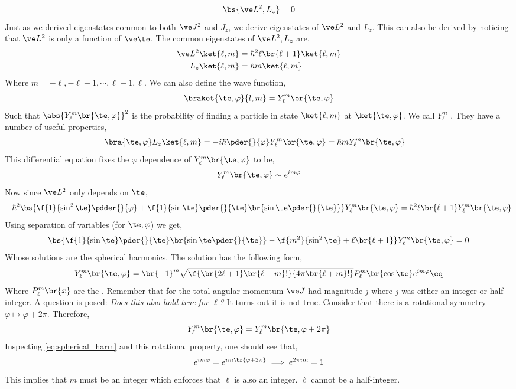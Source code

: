 \documentclass{article}
\begin{document}
\[ \bs{\ve L^2, L_z} = 0 \]
Just as we derived eigenstates common to both $\ve J^2$ and $J_z$, we derive eigenstates of $\ve L^2$ and $L_z$. This can also be derived by noticing that $\ve L^2$ is only a function of $\ve \te$. The common eigenstates of $\ve L^2, L_z$ are,
\begin{align*}
    \ve L^2 \ket{\ell, m} &= \hbar^2 \ell \br{\ell + 1} \ket{\ell, m} \\
    L_z \ket{\ell, m} &= \hbar m \ket{\ell, m}
\end{align*}
Where $m = -\ell, -\ell +1, \cdots, \ell - 1, \ell$. We can also define the wave function,
\[ \braket{\te ,\varphi}{l,m} = Y^{m}_{\ell}\br{\te, \varphi} \]
Such that $\abs{Y^{m}_{\ell}\br{\te, \varphi}}^2$ is the probability of finding a particle in state $\ket{\ell, m}$ at $\ket{\te, \varphi}$. We call $Y^{m}_{\ell}$ . They have a number of useful properties,
\begin{align*}
\bra{\te, \varphi} L_z \ket{\ell, m} = - i \hbar \pder{}{\varphi} Y_{\ell}^{m}\br{\te, \varphi} &= \hbar m Y_{\ell}^{m}\br{\te, \varphi}
\end{align*}
This differential equation fixes the $\varphi$ dependence of $Y_{\ell}^{m}\br{\te, \varphi}$ to be,
\[ Y_{\ell}^{m}\br{\te, \varphi} \sim e^{i m \varphi} \]
Now since $\ve L^2$ only depends on $\te$,
\begin{align*}
    - \hbar^2 \bs{\f{1}{\sin^2 \te} \pdder{}{\varphi} + \f{1}{\sin \te} \pder{}{\te} \br{\sin \te \pder{}{\te}}} Y_{\ell}^{m}\br{\te, \varphi} = \hbar^2 \ell \br{\ell+1}Y_{\ell}^{m}\br{\te, \varphi}
\end{align*}
Using separation of variables (for $\te, \varphi$) we get,
\[ \bs{\f{1}{\sin \te }\pder{}{\te}\br{\sin \te \pder{}{\te}} - \f{m^2}{\sin^2 \te} + \ell \br{\ell+1 }}Y_{\ell}^{m}\br{\te, \varphi} = 0 \]
Whose solutions are the spherical harmonics. The solution has the following form,
\[ Y_{\ell}^{m}\br{\te, \varphi} = \br{-1}^{m} \sqrt{\f{\br{2 \ell + 1}\br{\ell - m}!}{4 \pi \br{\ell + m }!}} P_{\ell}^{m}\br{\cos \te} e^{i m \varphi} \eq \label{eq:spherical_harm}\]
Where $P_{\ell}^{m}\br{x}$ are the . Remember that for the total angular momentum $\ve J$ had magnitude $j$ where $j$ was either an integer or half-integer. A question is posed: \textit{Does this also hold true for $\ell$?} It turns out it is not true. Consider that there is a rotational symmetry $\varphi \mapsto \varphi + 2\pi$. Therefore,
\[ Y_{\ell}^{m}\br{\te, \varphi} = Y_{\ell}^{m}\br{\te, \varphi + 2 \pi} \]
Inspecting \cref{eq:spherical_harm} and this rotational property, one should see that,
\[ e^{im\varphi} = e^{im\br{\varphi + 2 \pi}} \implies e^{2 \pi i m} = 1 \]
This implies that $m$ must be an integer which enforces that $\ell$ is also an integer. $\ell$ cannot be a half-integer.
\end{document}
